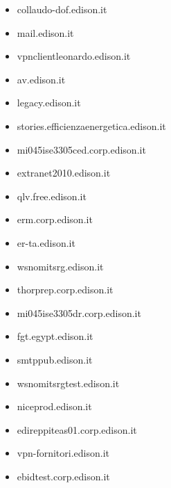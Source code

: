\documentclass{article}
\begin{document}
\begin{itemize}
            \item collaudo-dof.edison.it
        
            \item mail.edison.it
        
            \item vpnclientleonardo.edison.it
        
            \item av.edison.it
        
            \item legacy.edison.it
        
            \item stories.efficienzaenergetica.edison.it
        
            \item mi045ise3305ced.corp.edison.it
        
            \item extranet2010.edison.it
        
            \item qlv.free.edison.it
        
            \item erm.corp.edison.it
        
            \item er-ta.edison.it
        
            \item wsnomitsrg.edison.it
        
            \item thorprep.corp.edison.it
        
            \item mi045ise3305dr.corp.edison.it
        
            \item fgt.egypt.edison.it
        
            \item smtppub.edison.it
        
            \item wsnomitsrgtest.edison.it
        
            \item niceprod.edison.it
        
            \item edireppiteas01.corp.edison.it
        
            \item vpn-fornitori.edison.it
        
            \item ebidtest.corp.edison.it
        

\end{itemize}
\end{document}
